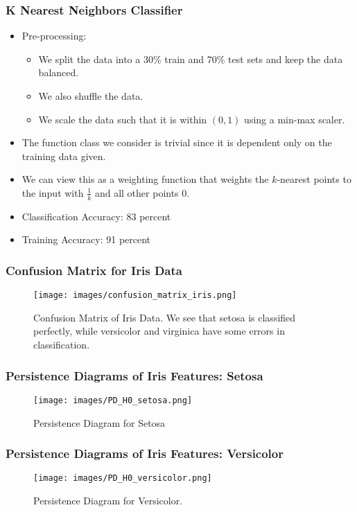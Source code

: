 		\begin{frame}
			\frametitle{K Nearest Neighbors Classifier}
			
			\begin{itemize}
				\item Pre-processing:
				\begin{itemize}
					\item We split the data into a 30\% train and 70\% test sets and keep the data balanced.
					\item We also shuffle the data.
					\item We scale the data such that it is within $(0,1)$ using a min-max scaler.
				\end{itemize}
				\item The function class we consider is trivial since it is dependent only on the training data given.
				\item We can view this as a weighting function that weights the $k$-nearest points to the input with $\frac{1}{k}$ and all other points $0$.
				\item Classification Accuracy: 83 percent
				\item Training Accuracy: 91 percent
			\end{itemize}
		\end{frame}
		
		\begin{frame}
			\frametitle{Confusion Matrix for Iris Data}
			
			\begin{figure}
				\centering
				\texttt{[image: images/confusion\_matrix\_iris.png]}
				\caption{Confusion Matrix of Iris Data. We see that setosa is classified perfectly, while versicolor and virginica have some errors in classification.}
		\end{figure}
		\end{frame}
		
		\begin{frame}
		\frametitle{Persistence Diagrams of Iris Features: Setosa}
		
		\begin{figure}
				\centering
				\texttt{[image: images/PD\_H0\_setosa.png]}
				\caption{Persistence Diagram for Setosa}
		\end{figure}
		\end{frame}

		\begin{frame}
		\frametitle{Persistence Diagrams of Iris Features: Versicolor}
		
		\begin{figure}
				\centering
				\texttt{[image: images/PD\_H0\_versicolor.png]}
				\caption{Persistence Diagram for Versicolor.}
		\end{figure}
		\end{frame}
		
